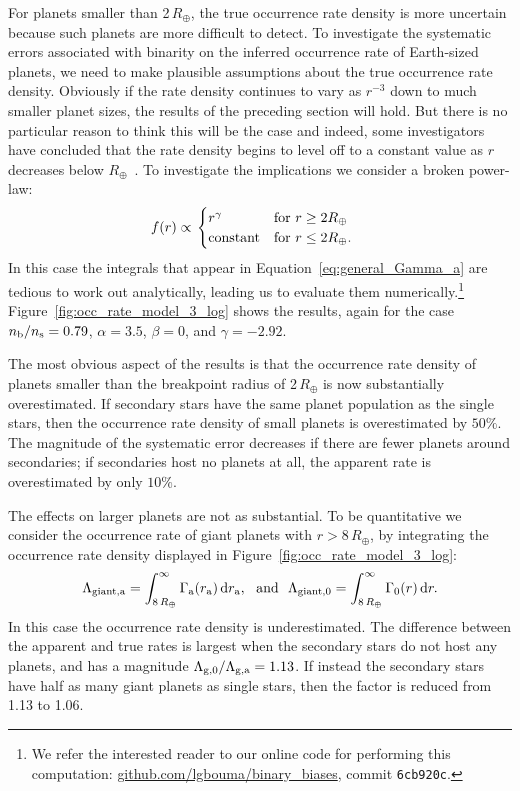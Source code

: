 \documentclass[12pt,modern]{aastex61}
\renewcommand{\a}{_{\rm a}}
\newcommand{\s}{_{\rm s}}
\renewcommand{\b}{_{\rm b}}
\begin{document}
For planets smaller than 2\,$R_\oplus$, the true occurrence rate
density is more uncertain because such planets are more difficult to
detect.  To investigate the systematic errors associated with binarity
on the inferred occurrence rate of Earth-sized planets, we need to
make plausible assumptions about the true occurrence rate density.
Obviously if the rate density continues to vary as $r^{-3}$ down to
much smaller planet sizes, the results of the preceding section will
hold.  But there is no particular reason to think this will be the
case and indeed, some investigators have concluded that the rate
density begins to level off to a constant value as $r$ decreases below
$R_\oplus$~\citep{petigura_plateau_2013}.  To investigate the
implications we consider a broken power-law:
\begin{align}
    f(r)
    &\propto
    \left.
    \begin{cases}
        r^\gamma & \text{for } r\geq 2R_\oplus \\
        {\rm constant} & \text{for } r\leq2R_\oplus.
    \end{cases}
    \right.
    \label{eq:model3_radius_distribution}
\end{align}
In this case the integrals that appear in
Equation~\ref{eq:general_Gamma_a} are tedious to work out
analytically, leading us to evaluate them numerically.\footnote{We
refer the interested reader to our online code for performing this
computation: \url{github.com/lgbouma/binary_biases}, commit
\texttt{6cb920c}.} Figure~\ref{fig:occ_rate_model_3_log} shows the
results, again for the case $n\b/n\s=0.79$, $\alpha = 3.5$, $\beta=0$,
and $\gamma=-2.92$.

The most obvious aspect of the results is that the occurrence rate
density of planets smaller than the breakpoint radius of 2\,$R_\oplus$
is now substantially overestimated.  If secondary stars have the same
planet population as the single stars, then the occurrence rate
density of small planets is overestimated by $50\%$.  The magnitude of
the systematic error decreases if there are fewer planets around
secondaries; if secondaries host no planets at all, the apparent rate
is overestimated by only $10\%$.

The effects on larger planets are not as substantial.  To be
quantitative we consider the occurrence rate of giant planets with
$r>8\,R_\oplus$, by integrating the occurrence rate density displayed
in Figure~\ref{fig:occ_rate_model_3_log}:
\begin{equation}
    \Lambda_{\rm giant,a} =
      \int_{8\,R_\oplus}^{\infty} \Gamma\a(r\a)\,{\rm d}r\a,~~{\rm
      and}~~
    \Lambda_{\rm giant,0} =
      \int_{8\,R_\oplus}^{\infty} \Gamma_0(r)\,{\rm d}r.
\end{equation}
In this case the occurrence rate density is underestimated.  The
difference between the apparent and true rates is largest when the
secondary stars do not host any planets, and has a magnitude
$\Lambda_{{\rm g},0}/\Lambda_{\rm g,a} = 1.13$.
If instead the secondary stars have half as many giant planets as single
stars, then the factor is reduced from 1.13 to 1.06.
\end{document}

